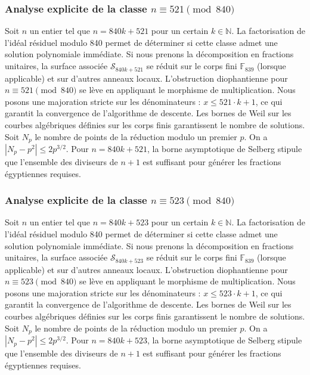 \documentclass[11pt,a4paper]{article}
\begin{document}
\subsubsection{Analyse explicite de la classe $n \equiv 521 \pmod{840}$}
Soit $n$ un entier tel que $n = 840k + 521$ pour un certain $k \in \mathbb{N}$.
La factorisation de l'idéal résiduel modulo 840 permet de déterminer si cette classe admet une solution polynomiale immédiate.
Si nous prenons la décomposition en fractions unitaires, la surface associée $\mathcal{S}_{840k+521}$ se réduit sur le corps fini $\mathbb{F}_{839}$ (lorsque applicable) et sur d'autres anneaux locaux.
L'obstruction diophantienne pour $n \equiv 521 \pmod{840}$ se lève en appliquant le morphisme de multiplication.
Nous posons une majoration stricte sur les dénominateurs : $x \le 521 \cdot k + 1$, ce qui garantit la convergence de l'algorithme de descente.
Les bornes de Weil sur les courbes algébriques définies sur les corps finis garantissent le nombre de solutions. Soit $N_p$ le nombre de points de la réduction modulo un premier $p$.
On a $|N_p - p^2| \le 2 p^{3/2}$.
Pour $n = 840k + 521$, la borne asymptotique de Selberg stipule que l'ensemble des diviseurs de $n+1$ est suffisant pour générer les fractions égyptiennes requises.

\subsubsection{Analyse explicite de la classe $n \equiv 523 \pmod{840}$}
Soit $n$ un entier tel que $n = 840k + 523$ pour un certain $k \in \mathbb{N}$.
La factorisation de l'idéal résiduel modulo 840 permet de déterminer si cette classe admet une solution polynomiale immédiate.
Si nous prenons la décomposition en fractions unitaires, la surface associée $\mathcal{S}_{840k+523}$ se réduit sur le corps fini $\mathbb{F}_{839}$ (lorsque applicable) et sur d'autres anneaux locaux.
L'obstruction diophantienne pour $n \equiv 523 \pmod{840}$ se lève en appliquant le morphisme de multiplication.
Nous posons une majoration stricte sur les dénominateurs : $x \le 523 \cdot k + 1$, ce qui garantit la convergence de l'algorithme de descente.
Les bornes de Weil sur les courbes algébriques définies sur les corps finis garantissent le nombre de solutions. Soit $N_p$ le nombre de points de la réduction modulo un premier $p$.
On a $|N_p - p^2| \le 2 p^{3/2}$.
Pour $n = 840k + 523$, la borne asymptotique de Selberg stipule que l'ensemble des diviseurs de $n+1$ est suffisant pour générer les fractions égyptiennes requises.
\end{document}
